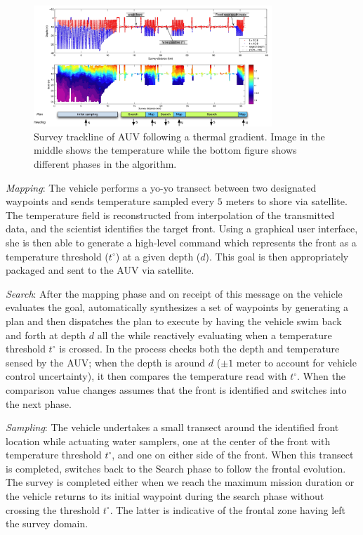 \begin{figure}[b]
\centering
\includegraphics[width=0.8\textwidth]{figs/front-mi.jpg}
\caption{\small{Survey trackline of AUV following a thermal
    gradient. Image in the middle shows the temperature while the
    bottom figure shows different phases in the algorithm.}}
\label{fig:mi-front}
\end{figure}

\emph{Mapping}: The vehicle performs a yo-yo transect between two
designated waypoints and sends temperature sampled every $5$ meters to
shore via satellite. The temperature field is reconstructed from
interpolation of the transmitted data, and the scientist identifies
the target front. Using a graphical user interface, she is then able
to generate a high-level command which represents the front as a
temperature threshold ($t^{\circ}$) at a given depth ($d$). This goal is
then appropriately packaged and sent to the AUV via satellite.

\emph{Search}: After the mapping phase and on receipt of this message
on the vehicle \rx evaluates the goal, automatically synthesizes a set
of waypoints by generating a plan and then dispatches the plan to
execute by having the vehicle swim back and forth at depth $d$ all the
while reactively evaluating when a temperature threshold $t^{\circ}$
is crossed. In the process \rx checks both the depth and temperature
sensed by the AUV; when the depth is around $d$ ($\pm 1$ meter to
account for vehicle control uncertainty), it then compares the
temperature read with $t^{\circ}$. When the comparison value changes
\rx assumes that the front is identified and switches into the next
phase.

\emph{Sampling}: The vehicle undertakes a small transect around the
identified front location while actuating water samplers, one at the
center of the front with temperature threshold $t^{\circ}$, and one on
either side of the front. When this transect is completed, \rx
switches back to the Search phase to follow the frontal evolution.
The survey is completed either when we reach the maximum mission
duration or the vehicle returns to its initial waypoint during the
search phase without crossing the threshold $t^{\circ}$. The latter is
indicative of the frontal zone having left the survey domain.

